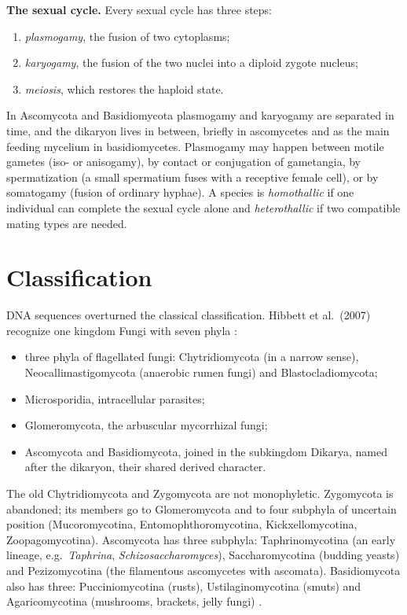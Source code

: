 \textbf{The sexual cycle.}
Every sexual cycle has three steps:
\begin{enumerate}
\item \emph{plasmogamy}, the fusion of two
cytoplasms;
\item \emph{karyogamy}, the fusion of the
two nuclei into a diploid zygote nucleus;
\item \emph{meiosis}, which restores the
haploid state.
\end{enumerate}
In Ascomycota and Basidiomycota plasmogamy
and karyogamy are separated in time, and the
dikaryon lives in between, briefly in
ascomycetes and as the main feeding
mycelium in basidiomycetes. Plasmogamy may
happen between motile gametes (iso- or
anisogamy), by contact or conjugation of
gametangia, by spermatization (a small
spermatium fuses with a receptive female
cell), or by somatogamy (fusion of ordinary
hyphae). A species is \emph{homothallic} if
one individual can complete the sexual
cycle alone and \emph{heterothallic} if two
compatible mating types are needed.

\section{Classification}
\label{section-classification}

DNA sequences overturned the classical
classification. Hibbett et al.\ (2007)
recognize one kingdom Fungi with seven phyla
\cite{hibbett2007higher}:
\begin{itemize}
\item three phyla of flagellated fungi:
Chytridiomycota (in a narrow sense),
Neocallimastigomycota (anaerobic rumen
fungi) and Blastocladiomycota;
\item Microsporidia, intracellular
parasites;
\item Glomeromycota, the arbuscular
mycorrhizal fungi;
\item Ascomycota and Basidiomycota, joined
in the subkingdom Dikarya, named after the
dikaryon, their shared derived character.
\end{itemize}
The old Chytridiomycota and Zygomycota are
not monophyletic. Zygomycota is abandoned;
its members go to Glomeromycota and to four
subphyla of uncertain position
(Mucoromycotina, Entomophthoromycotina,
Kickxellomycotina, Zoopagomycotina).
Ascomycota has three subphyla:
Taphrinomycotina (an early lineage, e.g.\
\emph{Taphrina}, \emph{Schizosaccharomyces}),
Saccharomycotina (budding yeasts) and
Pezizomycotina (the filamentous ascomycetes
with ascomata). Basidiomycota also has
three: Pucciniomycotina (rusts),
Ustilaginomycotina (smuts) and
Agaricomycotina (mushrooms, brackets, jelly
fungi) \cite{hibbett2007higher}.

